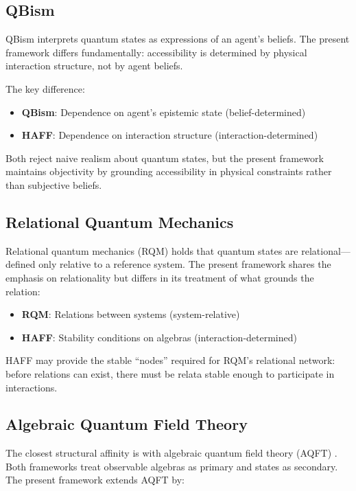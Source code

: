 \documentclass[12pt,a4paper,openany]{book}
\begin{document}
\subsection{QBism}

QBism \cite{Fuchs2014} interprets quantum states as expressions of an agent's beliefs. The present framework differs fundamentally: accessibility is determined by physical interaction structure, not by agent beliefs.

The key difference:
\begin{itemize}
    \item \textbf{QBism}: Dependence on agent's epistemic state (belief-determined)
    \item \textbf{HAFF}: Dependence on interaction structure (interaction-determined)
\end{itemize}

Both reject naive realism about quantum states, but the present framework maintains objectivity by grounding accessibility in physical constraints rather than subjective beliefs.

\subsection{Relational Quantum Mechanics}

Relational quantum mechanics (RQM) \cite{Rovelli1996} holds that quantum states are relational---defined only relative to a reference system. The present framework shares the emphasis on relationality but differs in its treatment of what grounds the relation:

\begin{itemize}
    \item \textbf{RQM}: Relations between systems (system-relative)
    \item \textbf{HAFF}: Stability conditions on algebras (interaction-determined)
\end{itemize}

HAFF may provide the stable ``nodes'' required for RQM's relational network: before relations can exist, there must be relata stable enough to participate in interactions.

\subsection{Algebraic Quantum Field Theory}

The closest structural affinity is with algebraic quantum field theory (AQFT) \cite{Haag1996}. Both frameworks treat observable algebras as primary and states as secondary. The present framework extends AQFT by:
\end{document}
